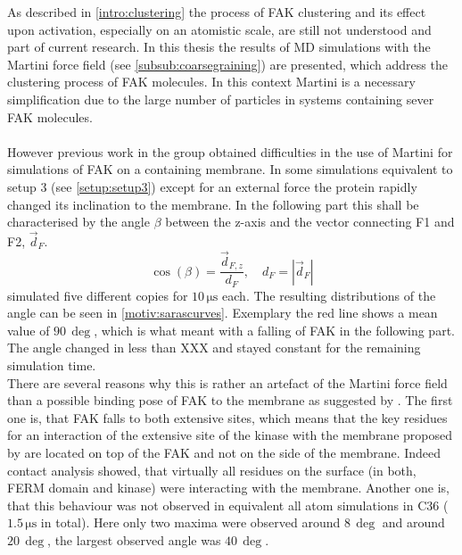 \label{motivation}
As described in \autoref{intro:clustering} the process of FAK clustering and its effect upon activation, especially on an atomistic scale, are still not understood and part of current research. In this thesis the results of MD simulations with the Martini force field (see \autoref{subsub:coarsegraining}) are presented, which address the clustering process of FAK molecules. In this context Martini is a necessary simplification due to the large number of particles in systems containing sever FAK molecules.\\
\\
However previous work in the group \autocite{sara} obtained difficulties in the use of Martini for simulations of FAK on a \pip{} containing membrane. In some simulations equivalent to setup 3 (see \autoref{setup:setup3}) except for an external force the protein rapidly changed its inclination to the membrane. In the following part this shall be characterised by the angle $\beta$ between the z-axis and the vector connecting F1 and F2, $\vec{d}_F$.
\begin{equation}
\cos\left(\beta\right) = \frac{\vec{d}_{F, z}}{d_F},\quad d_F = \left|\vec{d}_F\right|
\end{equation}
\textcite{sara} simulated five different copies for $10\,\si{\micro\second}$ each. The resulting distributions of the angle can be seen in \autoref{motiv:sarascurves}. Exemplary the red line shows a mean value of $90\,\si{\deg}$, which is what meant with a falling of FAK in the following part. The angle changed in less than XXX and stayed constant for the remaining simulation time.\\
There are several reasons why this is rather an artefact of the Martini force field than a possible binding pose of FAK to the membrane as suggested by \textcite{pap002}. The first one is, that FAK falls to both extensive sites, which means that the key residues for an interaction of the extensive site of the kinase with the membrane proposed by \textcite{pap002} are located on top of the FAK and not on the side of the membrane. Indeed contact analysis showed, that virtually all residues on the surface (in both, FERM domain and kinase) were interacting with the membrane. Another one is, that this behaviour was not observed in equivalent all atom simulations in C36 ($1.5\,\si{\micro\second}$ in total). Here only two maxima were observed around $8\,\si{\deg}$ and around $20\,\si{\deg}$, the largest observed angle was $40\,\si{\deg}$.\\
\\
